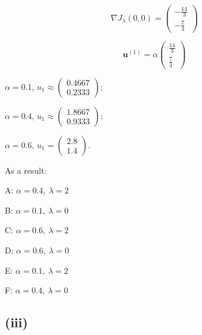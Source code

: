 \documentclass[11pt]{article}
\begin{document}
$$
\nabla J_\lambda(0, 0)
=
\begin{pmatrix}
    -\frac{14}{3} \\
    -\frac{7}{3}
\end{pmatrix}
$$

$$
\mathbf{u}^{(1)}
=
\alpha
\begin{pmatrix}
    \frac{14}{3} \\
    \frac{7}{3}
\end{pmatrix}
$$

$\alpha = 0.1$, $u_1
\approx
\begin{pmatrix}
    0.4667 \\
    0.2333
\end{pmatrix}$;

$\alpha = 0.4$, $u_1
\approx
\begin{pmatrix}
    1.8667 \\
    0.9333
\end{pmatrix}$;

$\alpha = 0.6$, $u_1
=
\begin{pmatrix}
    2.8 \\
    1.4
\end{pmatrix}$.

As a result:

A: $\alpha = 0.4, \ \lambda = 2$

B: $\alpha = 0.1, \ \lambda = 0$

C: $\alpha = 0.6, \ \lambda = 2$

D: $\alpha = 0.6, \ \lambda = 0$

E: $\alpha = 0.1, \ \lambda = 2$

F: $\alpha = 0.4, \ \lambda = 0$

\subsection*{(iii)}
\end{document}
